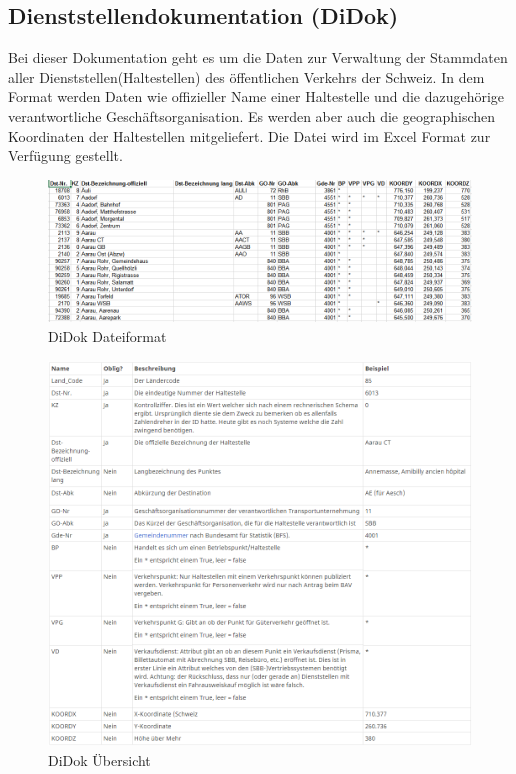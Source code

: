 \documentclass[a4paper,12pt]{scrartcl}
\begin{document}
\subsection{Dienststellendokumentation (DiDok)}
\label{sec:didok}
Bei dieser Dokumentation geht es um die Daten zur Verwaltung der Stammdaten aller Dienststellen(Haltestellen) des öffentlichen Verkehrs der Schweiz. In dem Format werden Daten wie offizieller Name einer Haltestelle und die dazugehörige verantwortliche Geschäftsorganisation. Es werden aber auch die geographischen Koordinaten der Haltestellen mitgeliefert. Die Datei wird im Excel Format zur Verfügung gestellt.

\begin{figure}[]
	\centering
	\includegraphics[width=17cm]{img/didokdateiformat.png}
	\caption{DiDok Dateiformat}
	\label{fig:didok-dateiformat}
\end{figure}

\begin{figure}[]
	\centering
	\includegraphics[scale=0.75]{img/didokuebersicht.png}
	\caption{DiDok Übersicht  \cite{didok}}
	\label{fig:didok-uebersicht}
\end{figure}
\end{document}
